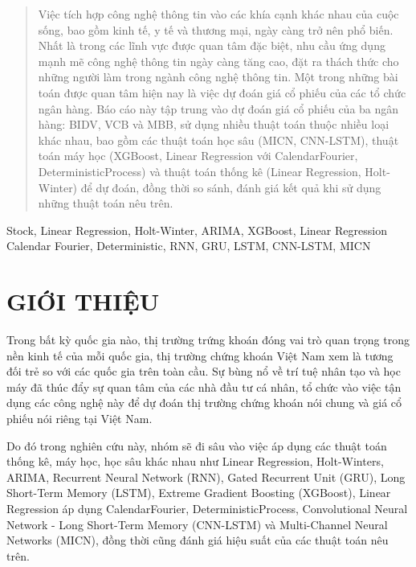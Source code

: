 \documentclass[conference]{IEEEtran}
\begin{document}
\maketitle

\begin{abstract}
Việc tích hợp công nghệ thông tin vào các khía cạnh khác nhau của cuộc sống, bao gồm kinh tế, y tế và thương mại, ngày càng trở nên phổ biến. Nhất là trong các lĩnh vực được quan tâm đặc biệt, nhu cầu ứng dụng mạnh mẽ công nghệ thông tin ngày càng tăng cao, đặt ra thách thức cho những người làm trong ngành công nghệ thông tin. Một trong những bài toán được quan tâm hiện nay là việc dự đoán giá cổ phiếu của các tổ chức ngân hàng. Báo cáo này tập trung vào dự đoán giá cổ phiếu của ba ngân hàng: BIDV, VCB và MBB, sử dụng nhiều thuật toán thuộc nhiều loại khác nhau, bao gồm các thuật toán học sâu (MICN, CNN-LSTM), thuật toán máy học (XGBoost, Linear Regression với CalendarFourier, DeterministicProcess) và thuật toán thống kê (Linear Regression, Holt-Winter) để dự đoán, đồng thời so sánh, đánh giá kết quả khi sử dụng những thuật toán nêu trên.
\end{abstract}

\begin{IEEEkeywords}
Stock, Linear Regression, Holt-Winter, ARIMA, XGBoost, Linear Regression Calendar Fourier, Deterministic, RNN, GRU, LSTM, CNN-LSTM, MICN
\end{IEEEkeywords}

\section{GIỚI THIỆU}
Trong bất kỳ quốc gia nào, thị trường trứng khoán đóng vai trò quan trọng trong nền kinh tế của mỗi quốc gia, thị trường chứng khoán Việt Nam xem là tương đối trẻ so với các quốc gia trên toàn cầu. Sự bùng nổ về trí tuệ nhân tạo và học máy đã thúc đẩy sự quan tâm của các nhà đầu tư cá nhân, tổ chức vào việc tận dụng các công nghệ này để dự đoán thị trường chứng khoán nói chung và giá cổ phiếu nói riêng tại Việt Nam. 

Do đó trong nghiên cứu này, nhóm sẽ đi sâu vào việc áp dụng các thuật toán thống kê, máy học, học sâu khác nhau như Linear Regression, Holt-Winters, ARIMA, Recurrent Neural Network (RNN), Gated Recurrent Unit (GRU), Long Short-Term Memory (LSTM), Extreme Gradient Boosting (XGBoost), Linear Regression áp dụng CalendarFourier, DeterministicProcess, Convolutional Neural Network - Long Short-Term Memory (CNN-LSTM) và Multi-Channel Neural Networks (MICN), đồng thời cũng đánh giá hiệu suất của các thuật toán nêu trên. 
\end{document}
